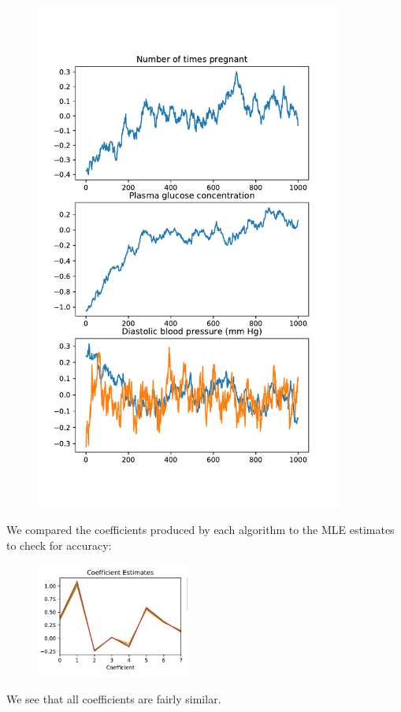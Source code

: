 \begin{figure}[H]
\begin{minipage}{0.45\textwidth}
		\includegraphics[width=0.9\textwidth]{sghmc-trace-pima.pdf} %
	\end{minipage}
\end{figure}


We compared the coefficients produced by each algorithm to the MLE estimates to check for accuracy:

\begin{figure}[H]
	\centering
	\includegraphics[width=0.45\textwidth]{coefs-pima.pdf}
\end{figure}

We see that all coefficients are fairly similar.